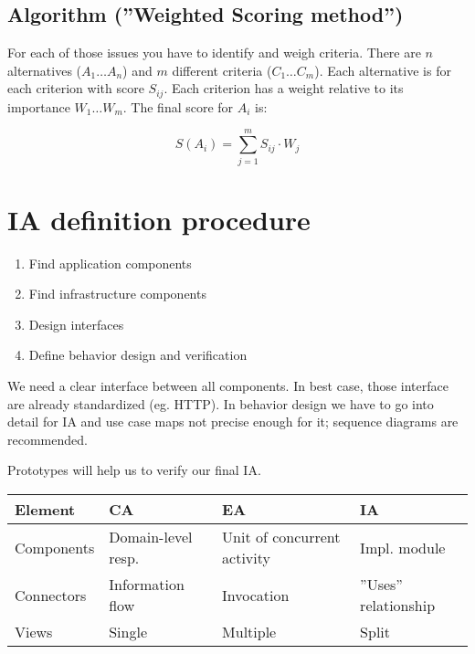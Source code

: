 \documentclass[a4paper]{report}
\begin{document}
\subsection{Algorithm (''Weighted Scoring method'')}

For each of those issues you have to identify and weigh criteria.
There are $n$ alternatives ($A_1\ldots A_n$) and $m$ different criteria
($C_1\ldots C_m$). Each alternative is for each criterion with score
$S_{ij}$. Each criterion has a weight relative to its importance
$W_1\ldots W_m$. The final score for $A_i$ is:

\[
    S(A_i) = \sum_{j=1}^m S_{ij} \cdot W_j
\]

\section{IA definition procedure}

\begin{enumerate}
  \item Find application components
  \item Find infrastructure components
  \item Design interfaces
  \item Define behavior design and verification
\end{enumerate}

We need a clear interface between all components. In best case, those
interface are already standardized (eg. HTTP). In behavior design we have
to go into detail for IA and use case maps not precise enough for it;
sequence diagrams are recommended.

Prototypes will help us to verify our final IA.


\begin{table}[h]
  \begin{center}
    \begin{tabular}{llll}
      Element & CA & EA & IA \\
    \hline \hline
      Components & Domain-level resp. & Unit of concurrent activity & Impl. module \\

      Connectors & Information flow & Invocation & ''Uses'' relationship \\
      Views & Single & Multiple & Split \\
    \end{tabular}
  \end{center}
\end{table}
\end{document}
